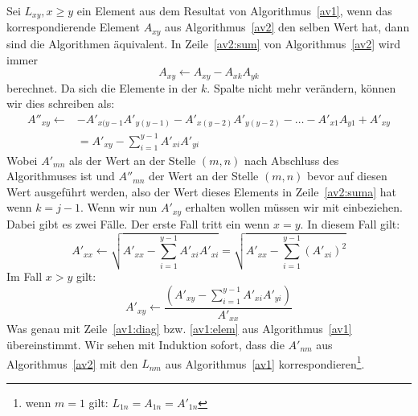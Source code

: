 Sei $L_{xy}, x\ge y$ ein Element aus dem Resultat von Algorithmus~\ref{av1}, wenn das
korrespondierende Element $A_{xy}$ aus Algorithmus~\ref{av2} den selben Wert hat, dann
sind die Algorithmen äquivalent. In Zeile~\ref{av2:sum} von Algorithmus~\ref{av2} 
wird immer 
\begin{equation*}
    A_{xy}\gets A_{xy}-A_{xk}A_{yk} 
\end{equation*}
berechnet. Da sich die Elemente in der $k$. Spalte nicht mehr verändern, können wir 
dies schreiben als:
\begin{align*}
    A''_{xy}\gets& -A'_{x(y-1}A'_{y(y-1)}-A'_{x(y-2)}A'_{y(y-2)}-\dots-A'_{x1}A_{y1}+A'_{xy} \\
          &=A'_{xy}-\sum_{i=1}^{y-1}A'_{xi}A'_{yi}
\end{align*}
Wobei $A'_{mn}$ als der Wert an der Stelle $(m,n)$ nach Abschluss des Algorithmuses ist und 
$A''_{mn}$ der Wert an der Stelle $(m,n)$ bevor \linespanK 
auf diesen Wert ausgeführt werden, also der Wert dieses Elements in Zeile~\ref{av2:suma} hat
wenn $k=j-1$. Wenn wir nun $A'_{xy}$ erhalten wollen müssen wir \linespanK mit einbeziehen.
Dabei gibt es zwei Fälle. Der erste Fall tritt ein wenn $x=y$. In diesem Fall gilt: 
\begin{equation*}
    A'_{xx} \gets \sqrt{A'_{xx}-\sum_{i=1}^{y-1}A'_{xi}A'_{xi}} = 
                  \sqrt{A'_{xx}-\sum_{i=1}^{y-1}(A'_{xi})^2}
\end{equation*}
Im Fall $x>y$ gilt:
\begin{equation*}
    A'_{xy}\gets \frac{\left(A'_{xy}-\sum_{i=1}^{y-1}A'_{xi}A'_{yi}\right)}{A'_{xx}}
\end{equation*}
Was genau mit Zeile~\ref{av1:diag} bzw. \ref{av1:elem} aus Algorithmus~\ref{av1} 
übereinstimmt.
Wir sehen mit Induktion sofort, dass die $A'_{nm}$ aus Algorithmus~\ref{av2} mit den
$L_{nm}$ aus Algorithmus~\ref{av1} korrespondieren\footnote{wenn $m=1$ gilt: $L_{1n}=
A_{1n}=A'_{1n}$}.

